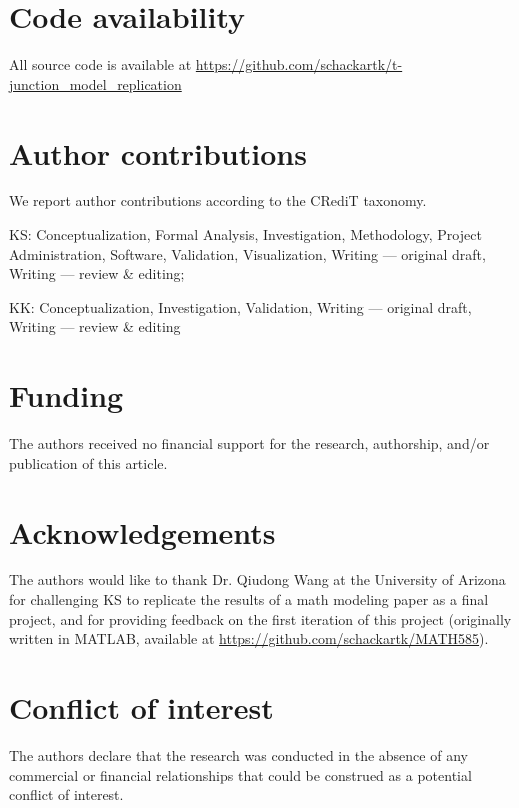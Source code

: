 \section{Code availability}

All source code is available at \url{https://github.com/schackartk/t-junction_model_replication}

\section{Author contributions}

We report author contributions according to the CRediT taxonomy\supercite{allen_how_2019}.

\noindent KS: Conceptualization, Formal Analysis, Investigation, Methodology,
Project Administration, Software, Validation, Visualization, Writing — original draft,
Writing — review \& editing;

\noindent KK: Conceptualization, Investigation, Validation, Writing — original draft,
Writing — review \& editing

\section{Funding}

The authors received no financial support for the research, authorship,
and/or publication of this article.

\section{Acknowledgements}

The authors would like to thank Dr. Qiudong Wang at the University of Arizona for
challenging KS to replicate the results of a math modeling paper as a final project, and
for providing feedback on the first iteration of this project (originally written
in MATLAB, available at \url{https://github.com/schackartk/MATH585}).

\section{Conflict of interest}

The authors declare that the research was conducted in the absence of any commercial or
financial relationships that could be construed as a potential conflict of interest.
